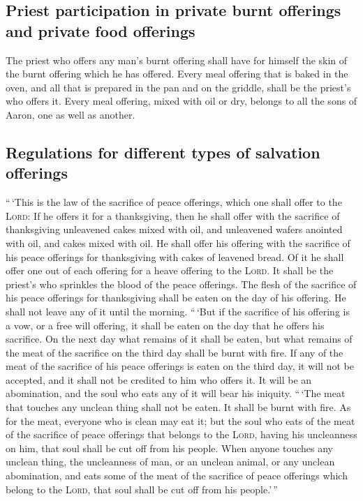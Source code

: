 \hypertarget{priest-participation-in-private-burnt-offerings-and-private-food-offerings}{%
\subsection{Priest participation in private burnt offerings and private
food
offerings}\label{priest-participation-in-private-burnt-offerings-and-private-food-offerings}}

 The priest who offers any man's burnt offering shall have
for himself the skin of the burnt offering which he has offered.
 Every meal offering that is baked in the oven, and all
that is prepared in the pan and on the griddle, shall be the priest's
who offers it.  Every meal offering, mixed with oil or
dry, belongs to all the sons of Aaron, one as well as another.

\hypertarget{regulations-for-different-types-of-salvation-offerings}{%
\subsection{Regulations for different types of salvation
offerings}\label{regulations-for-different-types-of-salvation-offerings}}

 ``\,`This is the law of the sacrifice of peace
offerings, which one shall offer to the \textsc{Lord}: 
If he offers it for a thanksgiving, then he shall offer with the
sacrifice of thanksgiving unleavened cakes mixed with oil, and
unleavened wafers anointed with oil, and cakes mixed with oil.
 He shall offer his offering with the sacrifice of his
peace offerings for thanksgiving with cakes of leavened bread.
 Of it he shall offer one out of each offering for a
heave offering to the \textsc{Lord}. It shall be the priest's who
sprinkles the blood of the peace offerings.  The flesh of
the sacrifice of his peace offerings for thanksgiving shall be eaten on
the day of his offering. He shall not leave any of it until the morning.
 ``\,`But if the sacrifice of his offering is a vow, or a
free will offering, it shall be eaten on the day that he offers his
sacrifice. On the next day what remains of it shall be eaten,
 but what remains of the meat of the sacrifice on the
third day shall be burnt with fire.  If any of the meat
of the sacrifice of his peace offerings is eaten on the third day, it
will not be accepted, and it shall not be credited to him who offers it.
It will be an abomination, and the soul who eats any of it will bear his
iniquity.  ``\,`The meat that touches any unclean thing
shall not be eaten. It shall be burnt with fire. As for the meat,
everyone who is clean may eat it;  but the soul who eats
of the meat of the sacrifice of peace offerings that belongs to the
\textsc{Lord}, having his uncleanness on him, that soul shall be cut off
from his people.  When anyone touches any unclean thing,
the uncleanness of man, or an unclean animal, or any unclean
abomination, and eats some of the meat of the sacrifice of peace
offerings which belong to the \textsc{Lord}, that soul shall be cut off
from his people.'\,''


